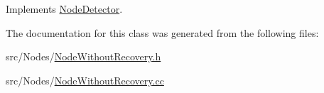 Implements \hyperlink{class_node_detector_a51e7dccd54e94bbe937752ca39dfdba4}{Node\+Detector}.



The documentation for this class was generated from the following files\+:\begin{DoxyCompactItemize}
\item 
src/\+Nodes/\hyperlink{_node_without_recovery_8h}{Node\+Without\+Recovery.\+h}\item 
src/\+Nodes/\hyperlink{_node_without_recovery_8cc}{Node\+Without\+Recovery.\+cc}\end{DoxyCompactItemize}
